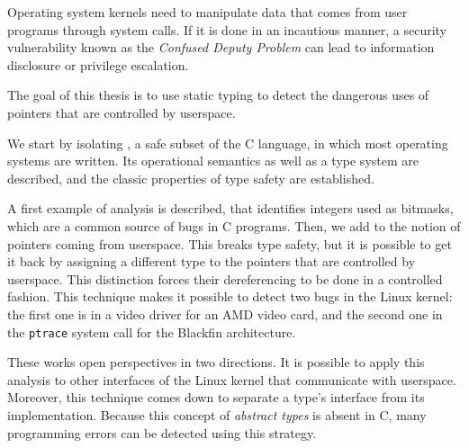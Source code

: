 \begin{headingpage}
Operating system kernels need to manipulate data that comes from user programs
through system calls. If it is done in an incautious manner, a security
vulnerability known as the \emph{Confused Deputy Problem} can lead to
information disclosure or privilege escalation.

The goal of this thesis is to use static typing to detect the dangerous uses of
pointers that are controlled by userspace.

We start by isolating \langname{}, a safe subset of the C language, in which
most operating systems are written. Its operational semantics as well as a type
system are described, and the classic properties of type safety are established.

A first example of analysis is described, that identifies integers used as
bitmasks, which are a common source of bugs in C programs. Then, we add to
\langname the notion of pointers coming from userspace. This breaks type safety,
but it is possible to get it back by assigning a different type to the pointers
that are controlled by userspace. This distinction forces their dereferencing to
be done in a controlled fashion. This technique makes it possible to detect two
bugs in the Linux kernel: the first one is in a video driver for an AMD
video card, and the second one in the \texttt{ptrace} system call for the
Blackfin architecture.

These works open perspectives in two directions. It is possible to apply
this analysis to other interfaces of the Linux kernel that communicate with
userspace. Moreover, this technique comes down to separate a type's interface
from its implementation. Because this concept of \emph{abstract types} is absent
in C, many programming errors can be detected using this strategy.





\end{headingpage}
\restoregeometry{}

